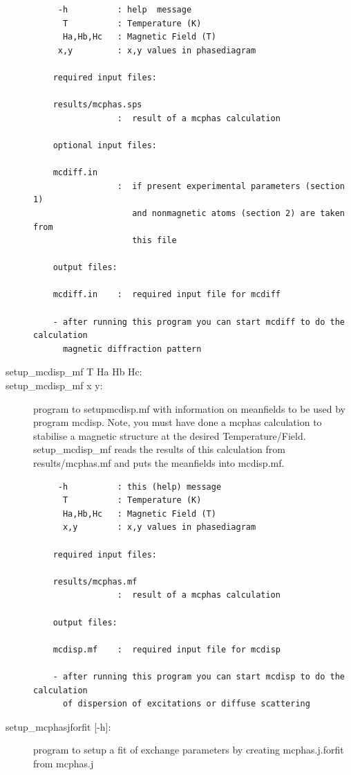 \begin{description}
\begin{verbatim}
     -h          : help  message
      T          : Temperature (K)
      Ha,Hb,Hc   : Magnetic Field (T)
     x,y         : x,y values in phasediagram

    required input files:

    results/mcphas.sps
                 :  result of a mcphas calculation

    optional input files:

    mcdiff.in
                 :  if present experimental parameters (section 1)
                    and nonmagnetic atoms (section 2) are taken from
                    this file

    output files:

    mcdiff.in    :  required input file for mcdiff

    - after running this program you can start mcdiff to do the calculation
      magnetic diffraction pattern
\end{verbatim}
\item [ \prg   setup\_mcdisp\_mf \index{setup\_mcdisp\_mf} T Ha Hb Hc:] 
\item [ \prg   setup\_mcdisp\_mf \index{setup\_mcdisp\_mf} x y:] 

program to setup{\prg mcdisp.mf} with information on meanfields
                    to be used by program {\prg mcdisp}. Note, you must
                    have done a {\prg mcphas} calculation to stabilise
                    a magnetic structure at the desired Temperature/Field.
                    {\prg   setup\_mcdisp\_mf} reads the results of this calculation
                    from {\prg  results/mcphas.mf} and puts the meanfields into
                    {\prg mcdisp.mf}.


\begin{verbatim}
     -h          : this (help) message
      T          : Temperature (K)
      Ha,Hb,Hc   : Magnetic Field (T)
      x,y        : x,y values in phasediagram

    required input files:

    results/mcphas.mf
                 :  result of a mcphas calculation

    output files:

    mcdisp.mf    :  required input file for mcdisp

    - after running this program you can start mcdisp to do the calculation
      of dispersion of excitations or diffuse scattering
\end{verbatim}
\item[\prg   setup\_mcphasjforfit\index{setup\_mcphasjforfit}  {[-h]}:] program to setup a fit of exchange parameters by   creating mcphas.j.forfit from mcphas.j
                    

\end{description}
